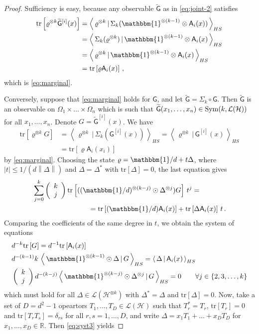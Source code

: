 \documentclass[12pt]{amsart}
\theoremstyle{definition}
\newcommand{\real}{\mathbb R} %
\newcommand{\mo}[1]{\left| #1 \right|} %
\newcommand{\abs}{\mo} %
\newcommand{\hh}{\mathcal{H}} %
\newcommand{\lh}{\mathcal{L(H)}} %
\newcommand{\elle}[1]{\mathcal{L}(#1)} %
\newcommand{\ip}[2]{\left\langle\,#1\,|\,#2\,\right\rangle} %
\newcommand{\no}[1]{\left\|#1\right\|} %
\newcommand{\tr}[1]{\mathrm{tr}\left[#1\right]} %
\newcommand{\id}{\mathbbm{1}} %
\newcommand{\A}{\mathsf{A}}%
\newcommand{\G}{\mathsf{G}}%
\newcommand{\Sym}{{\rm Sym}}
\newcommand{\Bin}[2]{\left(\begin{array}{c} #1 \\ #2 \end{array}\right)}
\begin{document}
\begin{proof}
Sufficiency is easy, because any observable $\widetilde{\G}$ as in \eqref{eq:joint-2} satisfies
\begin{align*}
\tr{\varrho^{\otimes k}\widetilde{\G}^{[i]}(x)} & = \ip{\varrho^{\otimes k}}{\Sigma_k(\id^{\otimes (k-1)}\otimes\A_i(x))}_{HS} \\
& = \ip{\Sigma_k(\varrho^{\otimes k})}{\id^{\otimes (k-1)}\otimes\A_i(x)}_{HS} \\
& = \ip{\varrho^{\otimes k}}{\id^{\otimes (k-1)}\otimes\A_i(x)}_{HS} \\
& = \tr{\varrho\A_i(x)} \,,
\end{align*}
which is \eqref{eq:marginal}.

Conversely, suppose that \eqref{eq:marginal} holds for $\G$, and let $\widetilde{\G} = \Sigma_k\circ\G$. Then $\widetilde{\G}$ is an observable on $\Omega_1\times\ldots\times\Omega_n$ which is such that $\widetilde{\G}(x_1,\ldots,x_n)\in\Sym(k,\lh)$ for all $x_1,\ldots,x_n$. Denote $G = \widetilde{\G}^{[i]}(x)$. We have
\begin{equation*}
\begin{aligned}
\tr{\varrho^{\otimes k} G} & = \ip{\varrho^{\otimes k}}{\Sigma_k(\G^{[i]}(x))}_{HS} = \ip{\varrho^{\otimes k}}{\G^{[i]}(x)}_{HS} \\
& = \tr{\varrho\A_i(x_i)}
\end{aligned}
\end{equation*}
by \eqref{eq:marginal}. Choosing the state $\varrho = \id/d + t\Delta$, where $\abs{t}\leq  1/(d\no{\Delta})$ and $\Delta = \Delta^*$ with $\tr{\Delta} = 0$, the last equation gives
\begin{align*}
& \sum_{j=0}^k \Bin{k}{j} \tr{((\id/d)^{\otimes (k-j)}\odot\Delta^{\otimes j}) G} \, t^j = \\
& \qquad \qquad \qquad \qquad = \tr{(\id/d)\A_i(x)} + \tr{\Delta\A_i(x)}\, t \,.
\end{align*}
Comparing the coefficients of the same degree in $t$, we obtain the system of equations
\begin{align}
& d^{-k}\tr{G} = d^{-1}\tr{\A_i(x)} \label{eq:syst1}\\
& d^{-(k-1)}k\,\ip{\id^{\otimes (k-1)}\odot\Delta}{G}_{HS} = \ip{\Delta}{\A_i(x)}_{HS} \label{eq:syst2}\\
& \Bin{k}{j} d^{-(k-j)} \ip{\id^{\otimes (k-j)}\odot\Delta^{\otimes j}}{G}_{HS} = 0 \qquad \forall j\in\{2,3,\ldots,k\} \label{eq:syst3}
\end{align}
which must hold for all $\Delta\in\elle{\hh^{\otimes k}}$ with $\Delta^* = \Delta$ and $\tr{\Delta} = 0$. Now, take a set of $D=d^2-1$ opeartors $T_1,\ldots,T_D\in\lh$ such that $T_r^* = T_r$, $\tr{T_r} = 0$ and $\tr{T_r T_s} = \delta_{rs}$ for all $r,s=1,\ldots,D$, and write $\Delta = x_1 T_1+\ldots+x_D T_D$ for $x_1,\ldots,x_D\in\real$. Then \eqref{eq:syst3} yields

\end{proof}
\end{document}
